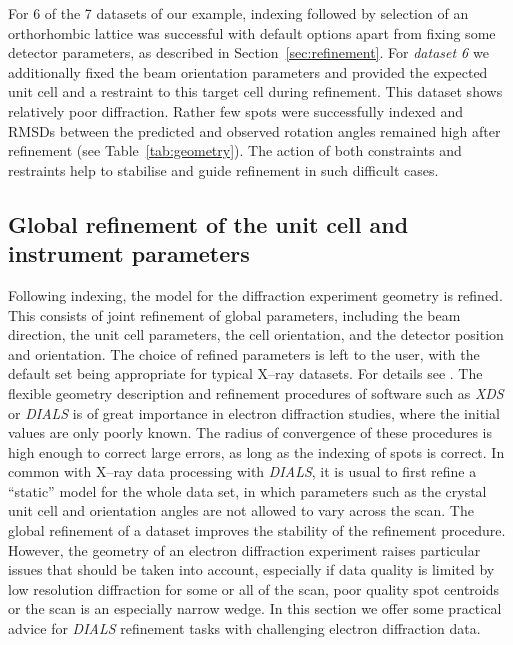\documentclass[preprint]{iucr}
\newcommand{\dials}{\emph{DIALS}\xspace}
\newcommand{\xds}{\emph{XDS}\xspace}
\begin{document}
For 6 of the 7 datasets of our example, indexing followed by selection of an
orthorhombic lattice was successful with default options apart from fixing some
detector parameters, as described in Section~\ref{sec:refinement}. For
\emph{dataset 6} we additionally fixed the beam orientation parameters and
provided the expected unit cell and a restraint to this target cell during
refinement. This dataset shows relatively poor diffraction. Rather few spots
were successfully indexed and RMSDs between the predicted and observed rotation
angles remained high after refinement (see Table~\ref{tab:geometry}).
The action of both constraints and restraints help to stabilise and
guide refinement in such difficult cases.

\subsection{Global refinement of the unit cell and instrument parameters
\label{sec:refinement}}

Following indexing, the model for the diffraction experiment geometry is refined.
This consists of joint refinement of global parameters, including the beam
direction, the unit cell parameters, the cell orientation, and the detector
position and orientation. The choice of refined parameters is left to the user,
with the default set being appropriate for typical X--ray datasets. For details
see . The flexible geometry description and refinement
procedures of software such as \xds or \dials is of great importance in electron
diffraction studies, where the initial values are only poorly known. The radius
of convergence of these procedures is high enough to correct large errors, as
long as the indexing of spots is correct. In common with X--ray data processing
with \dials, it is usual to first refine a ``static'' model for the whole data
set, in which parameters such as the crystal unit cell and orientation angles
are not allowed to vary across the scan. The global refinement of a dataset
improves the stability of the refinement procedure. However, the geometry of an
electron diffraction experiment raises particular issues that should be taken
into account, especially if data quality is limited by low resolution
diffraction for some or all of the scan, poor quality spot centroids or the
scan is an especially narrow wedge. In this section we offer some practical
advice for \dials refinement tasks with challenging electron diffraction data.
\end{document}
